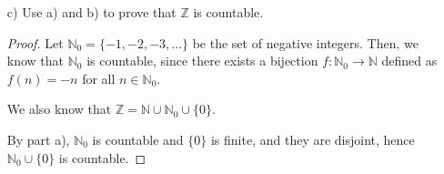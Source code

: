 \documentclass[11pt]{article}
\newcommand{\bbN}{\mathbb{N}}
\newcommand{\bbZ}{\mathbb{Z}}
\theoremstyle{definition}
\numberwithin{equation}{subsection}
\begin{document}
\begin{enumerate}
\begin{enumerate}
\begin{proof}
Case 1: if $X,Y$ are finite, then $|X \cup Y| = |X|+|Y|$, hence $X \cup Y$ is countable.

Case 2: if $X$ is finite and $Y$ is countable or vice versa, then by part a), $X \cup Y$ is countable.

Case 3: if $X,Y$ are infinite and countable, then we know that there exists a bijection $f \colon X \rightarrow \bbN$ and there exists a bijection $g \colon Y \rightarrow \bbN$.

Then, we define $h \colon X\cup Y \rightarrow \bbN$ as
\[
h(m) =
\begin{cases}
(2 \cdot f(m))-1 \text{ if } m \in X\\
2 \cdot g(m), \text{if } m \in Y.
\end{cases}
\]

First, we show that $h$ is surjective. For all $n \in \bbN$,
\[
n =
\begin{cases}
h(m_i) \text{ such that } m \in Y, i = \frac{n}{2} \text{ if } n \text{ is even}\\
h(m_j) \text{ such that } m \in X, j = \frac{n+1}{2} \text{ if } n \text{ is odd}.
\end{cases}
\]

Next, we show that $h$ is injective. 

Case 1: $m \in Y, m' \in X$, then $h(m)$ is even and $h(m')$ is odd, hence $h(m)\not = h(m')$.

Case 2: $m \in Y, m' \in Y, m\not = m'$. Then, $h(m)=2\cdot g(m) \not = 2 \cdot g(m') = h(m')$ since $g$ is injective.

Case 3: $m \in X, m' \in X, m\not = m'$. Then, $h(m)=(2\cdot f(m))-1 \not = (2 \cdot f(m'))-1 = h(m')$ since $f$ is injective.

This completes the proof.

\renewcommand\qedsymbol{QED}
\end{proof}
  \item[c)] Use a) and b) to prove that $\bbZ$ is countable.

\begin{proof}
Let $\bbN_0 = \{-1,-2,-3, \dots \}$ be the set of negative integers. Then, we know that $\bbN_0$ is countable, since there exists a bijection $f \colon \bbN_0 \rightarrow \bbN$ defined as $f(n)= -n$ for all $n \in \bbN_0$.

We also know that $\bbZ = \bbN \cup \bbN_0 \cup \{0\}$. 

By part a), $\bbN_0$ is countable and $\{0\}$ is finite, and they are disjoint, hence $\bbN_0 \cup \{0\}$ is countable.


\end{proof}
\end{enumerate}
\end{enumerate}
\end{document}
